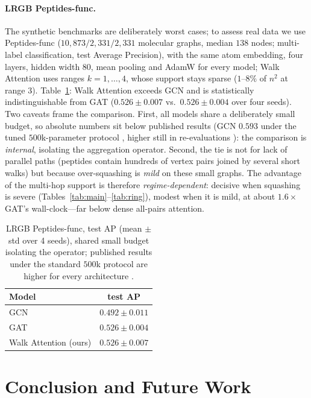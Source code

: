 \documentclass[runningheads]{llncs}
\begin{document}
\paragraph{LRGB Peptides-func.}
The synthetic benchmarks are deliberately worst cases; to assess real data we
use Peptides-func \cite{dwivedi2022lrgb} ($10{,}873/2{,}331/2{,}331$ molecular
graphs, median $138$ nodes; multi-label classification, test Average
Precision), with the same atom embedding, four layers, hidden width $80$, mean
pooling and AdamW for every model; Walk Attention uses ranges $k=1,\dots,4$,
whose support stays sparse ($1$--$8\%$ of $n^2$ at range $3$).
Table~\ref{tab:lrgb}: Walk Attention exceeds GCN and is statistically
indistinguishable from GAT ($0.526\pm0.007$ vs.\ $0.526\pm0.004$ over four
seeds). Two caveats frame the comparison. First, all models share a
deliberately small budget, so absolute numbers sit below published results
(GCN $0.593$ under the tuned $500$k-parameter protocol \cite{dwivedi2022lrgb},
higher still in re-evaluations \cite{tonshoff2023where}): the comparison is
\emph{internal}, isolating the aggregation operator. Second, the tie is not for
lack of parallel paths (peptides contain hundreds of vertex pairs joined by
several short walks) but because over-squashing is \emph{mild} on these small
graphs. The advantage of the multi-hop support is therefore
\emph{regime-dependent}: decisive when squashing is severe
(Tables~\ref{tab:main}--\ref{tab:ring}), modest when it is mild, at about
$1.6\times$ GAT's wall-clock---far below dense all-pairs attention.

\begin{table}[t]
\centering
\caption{LRGB Peptides-func, test AP (mean $\pm$ std over 4 seeds), shared
small budget isolating the operator; published results under the standard
$500$k protocol are higher for every architecture
\cite{dwivedi2022lrgb,tonshoff2023where}.}
\label{tab:lrgb}
\begin{tabular}{lc}
\toprule
\textbf{Model} & \textbf{test AP} \\
\midrule
GCN                          & $0.492\pm0.011$ \\
GAT                          & $0.526\pm0.004$ \\
Walk Attention (ours)        & $0.526\pm0.007$ \\
\bottomrule
\end{tabular}
\end{table}

\section{Conclusion and Future Work}\label{sec:conclusion}
\end{document}
